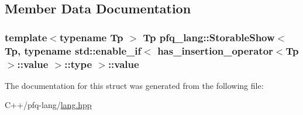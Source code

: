 \subsection{Member Data Documentation}
\hypertarget{structpfq__lang_1_1StorableShow_3_01Tp_00_01typename_01std_1_1enable__if_3_01has__insertion__ope410294f2cbdf117d0cfbbeb13476ebf1_a2d991395164d152da6dd32aa6f795984}{
\subsubsection[{value}]{\setlength{\rightskip}{0pt plus 5cm}template$<$typename Tp $>$ Tp {\bf pfq\+\_\+lang\+::\+Storable\+Show}$<$ Tp, typename std\+::enable\+\_\+if$<$ {\bf has\+\_\+insertion\+\_\+operator}$<$Tp $>$\+::value $>$\+::type $>$\+::value}}\label{structpfq__lang_1_1StorableShow_3_01Tp_00_01typename_01std_1_1enable__if_3_01has__insertion__ope410294f2cbdf117d0cfbbeb13476ebf1_a2d991395164d152da6dd32aa6f795984}


The documentation for this struct was generated from the following file\+:\begin{DoxyCompactItemize}
\item 
C++/pfq-\/lang/\hyperlink{lang_8hpp}{lang.\+hpp}\end{DoxyCompactItemize}
